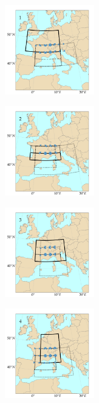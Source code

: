 \documentclass{ametsoc}
\begin{document}
\begin{figure}[htb]
	\centering
	\begin{subfigure}{.5\columnwidth}
		\centering
		\includegraphics[width=3.9cm]{figures/spatial_win_z4-hi4/Spatial_windows_1.png}
	\end{subfigure}%
	\begin{subfigure}{.5\columnwidth}
		\centering
		\includegraphics[width=3.9cm]{figures/spatial_win_z4-hi4/Spatial_windows_2.png}
	\end{subfigure}
	\begin{subfigure}{.5\columnwidth}
		\centering
		\includegraphics[width=3.9cm]{figures/spatial_win_z4-hi4/Spatial_windows_3.png}
	\end{subfigure}%
	\begin{subfigure}{.5\columnwidth}
		\centering
		\includegraphics[width=3.9cm]{figures/spatial_win_z4-hi4/Spatial_windows_4.png}
	\end{subfigure}

\end{figure}
\end{document}
